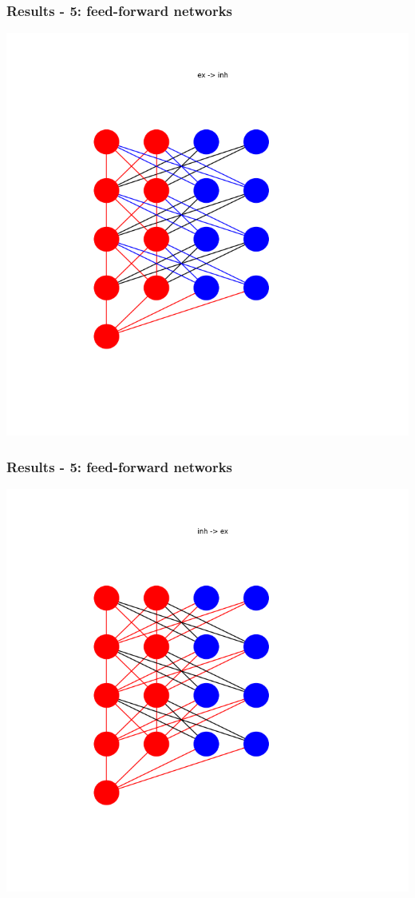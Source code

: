 \documentclass{beamer}
\begin{document}
\begin{frame}
    \frametitle{Results - 5: feed-forward networks}
    \includegraphics[width=\textwidth]{figures/ex -> inh.png}
\end{frame}

\begin{frame}
    \frametitle{Results - 5: feed-forward networks}
    \includegraphics[width=\textwidth]{figures/inh -> ex.png}
\end{frame}
\end{document}
